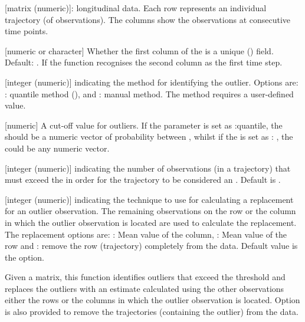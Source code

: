 \documentclass[a4paper]{book}
\begin{document}
\begin{Arguments}
\begin{ldescription}
\item[\code{traj}] [matrix (numeric)]: longitudinal data. Each row represents an individual trajectory (of observations). The columns show the observations at consecutive time points.

\item[\code{id\_field}] [numeric or character] Whether the first column of the  is a unique () field. Default: . If  the function recognises the second column as the first time step.

\item[\code{method}] [integer (numeric)] indicating the method for identifying the outlier. Options are: : quantile method (), and : manual method. The  method requires a user-defined value.

\item[\code{threshold}] [numeric] A cut-off value for outliers. If the  parameter is set as :quantile, the  should be a numeric vector of probability between \code{[0,1]}, whilst if the  is set as : , the  could be any numeric vector.

\item[\code{count}] [integer (numeric)] indicating the number of observations (in a trajectory) that must exceed the  in order for the trajectory to be considered an . Default is .

\item[\code{replace\_with}] [integer (numeric)] indicating the technique to use for calculating a replacement for an outlier observation. The remaining observations on the row or the column in which the outlier observation is located are used to calculate the replacement.
The replacement options are: : Mean value of the column, : Mean value of the row and : remove the row (trajectory) completely from the data. Default value is the  option.
\end{ldescription}
\end{Arguments}
%
\begin{Details}\relax
Given a matrix, this function identifies outliers that exceed the threshold and replaces the outliers with an estimate calculated using the other observations either the rows or the columns in which the outlier observation is located. Option is also provided to remove the trajectories (containing the outlier) from the data.
\end{Details}
\end{document}
